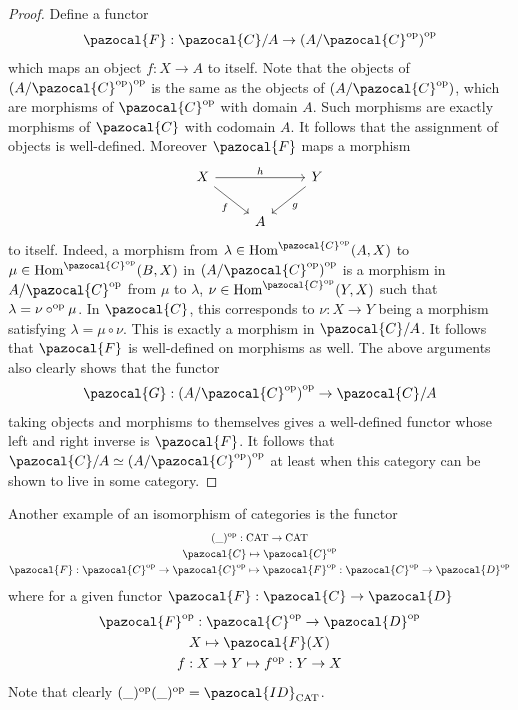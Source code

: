 \begin{proof}
    Define a functor 
    \begin{gather*}
        \pazocal{F} : \pazocal{C}/A \rightarrow \left(A/\pazocal{C}\op\right)\op
    \end{gather*}
    which maps an object $f: X\rightarrow A$ to itself. Note that the objects of $\left(A/\pazocal{C}\op\right)\op$ is the same as the objects of $\left(A/\pazocal{C}\op\right)$, which are morphisms of $\pazocal{C}\op$ with domain $A$. Such morphisms are exactly morphisms of $\pazocal{C}$ with codomain $A$. It follows that the assignment of objects is well-defined. Moreover $\pazocal{F}$ maps a morphism  
    $$
        \begin{tikzcd}
            X \arrow[rd, "f"'] \arrow[rr, "h"] & & Y\arrow[ld, "g"]\\
            & A 
        \end{tikzcd}
    $$ 
    to itself. Indeed, a morphism from $\lambda\in \Hom^{\pazocal{C}\op}(A,X)$ to $\mu\in \Hom^{\pazocal{C}\op}(B,X)$ in $\left(A/\pazocal{C}\op\right)\op$ is a morphism in $A/\pazocal{C}\op$ from $\mu$ to $\lambda$, $\nu\in \Hom^{\pazocal{C}\op}(Y,X)$ such that $\lambda = \nu\circ^\mathrm{op}\mu$. In $\pazocal{C}$, this corresponds to $\nu: X\rightarrow Y$ being a morphism satisfying $\lambda = \mu\circ \nu$. This is exactly a morphism in $\pazocal{C}/A$. It follows that $\pazocal{F}$ is well-defined on morphisms as well. The above arguments also clearly shows that the functor 
    \begin{gather*}
        \pazocal{G}: \left(A/\pazocal{C}\op\right)\op \rightarrow \pazocal{C}/A 
    \end{gather*}
    taking objects and morphisms to themselves gives a well-defined functor whose left and right inverse is $\pazocal{F}$. It follows that $\pazocal{C}/A\simeq \left(A/\pazocal{C}\op\right)\op$ at least when this category can be shown to live in some category.  
\end{proof}
\begin{example}
    Another example of an isomorphism of categories is the functor 
    \begin{gather*}
        (\_)\op : \mathrm{CAT} \rightarrow \mathrm{CAT}\\
        \pazocal{C} \mapsto \pazocal{C}\op\\
        \pazocal{F} : \pazocal{C}\op \rightarrow \pazocal{C}\op \mapsto \pazocal{F}\op : \pazocal{C}\op \rightarrow \pazocal{D}\op
    \end{gather*}
    where for a given functor $\pazocal{F}:\pazocal{C}\rightarrow \pazocal{D}$\\
    \begin{gather*}
        \pazocal{F}\op : \pazocal{C}\op \rightarrow \pazocal{D}\op\\
        X \mapsto \pazocal{F}(X)\\
        f : X \rightarrow Y \mapsto f\op : Y \rightarrow X
    \end{gather*}
    Note that clearly $(\_)\op(\_)\op = \pazocal{ID}_\mathrm{CAT}$.
\end{example}
